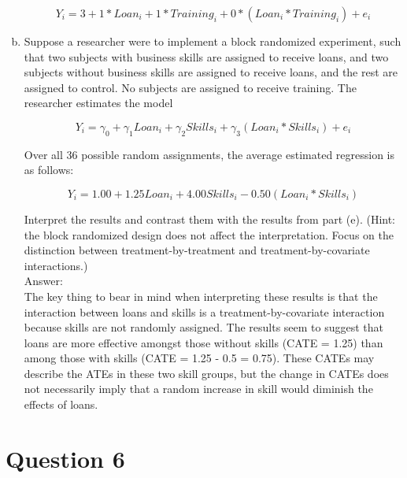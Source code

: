 \documentclass[11pt,notitlepage]{article}\usepackage[]{graphicx}\usepackage[]{color}
\makeatletter
\newenvironment{kframe}{%
 \def\at@end@of@kframe{}%
 \ifinner\ifhmode%
  \def\at@end@of@kframe{\end{minipage}}%
  \begin{minipage}{\columnwidth}%
 \fi\fi%
 \def\FrameCommand##1{\hskip\@totalleftmargin \hskip-\fboxsep
 \colorbox{shadecolor}{##1}\hskip-\fboxsep
     \hskip-\linewidth \hskip-\@totalleftmargin \hskip\columnwidth}%
 \MakeFramed {\advance\hsize-\width
   \@totalleftmargin\z@ \linewidth\hsize
   \@setminipage}}%
 {\par\unskip\endMakeFramed%
 \at@end@of@kframe}
\newenvironment{knitrout}{}{} %
\makeatother
\begin{document}
\begin{enumerate}[a)]
\begin{equation}
Y_i = 3 + 1*Loan_i + 1*Training_i + 0*(Loan_i * Training_i) + e_i
\end{equation}


\item Suppose a researcher were to implement a block randomized experiment, such that two subjects with business skills are assigned to receive loans, and two subjects without business skills are assigned to receive loans, and the rest are assigned to control. No subjects are assigned to receive training. The researcher estimates the model

\begin{equation}
Y_i = \gamma_0 + \gamma_1 Loan_i + \gamma_2 Skills_i + \gamma_3 (Loan_i * Skills_i) + e_i
\end{equation}

Over all 36 possible random assignments, the average estimated regression is as follows:

\begin{equation}
Y_i = 1.00 + 1.25 Loan_i + 4.00 Skills_i - 0.50 (Loan_i * Skills_i)
\end{equation}

Interpret the results and contrast them with the results from part (e). (Hint: the block randomized design does not affect the interpretation. Focus on the distinction between treatment-by-treatment and treatment-by-covariate interactions.)\\
Answer:\\
The key thing to bear in mind when interpreting these results is that the interaction between loans and skills is a treatment-by-covariate interaction because skills are not randomly assigned. The results seem to suggest that loans are more effective amongst those without skills (CATE = 1.25) than among those with skills (CATE = 1.25 - 0.5 = 0.75). These CATEs may describe the ATEs in these two skill groups, but the change in CATEs does not necessarily imply that a random increase in skill would diminish the effects of loans.  
\end{enumerate}

\section*{Question 6}
\begin{knitrout}
\color{fgcolor}\begin{kframe}
\begin{verbatim}





\end{verbatim}
\end{kframe}
\end{knitrout}
\end{document}
